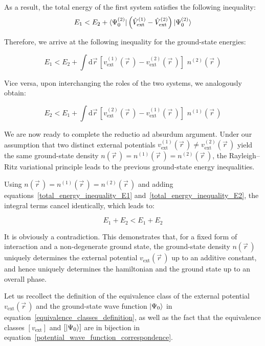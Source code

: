 As a result, the total energy of the first system satisfies the following inequality:
\begin{equation}
    E_1<E_2+\bra{\Psi_0^{(2)}}\left(\hat{V}_\mathrm{ext}^{(1)}-\hat{V}_\mathrm{ext}^{(2)}\right)\ket{\Psi_0^{(2)}}
\end{equation}

Therefore, we arrive at the following inequality for the ground-state energies:

\begin{equation}
    E_1<E_2+\int \mathrm{d}\vec{r}\,\left[v_\mathrm{ext}^{(1)}(\vec{r}\,)-v_\mathrm{ext}^{(2)}(\vec{r}\,)\right]\,\,n^{(2)}(\vec{r}\,)
\label{total_energy_inequality_E1}
\end{equation}

Vice versa, upon interchanging the roles of the two systems, we analogously obtain:

\begin{equation}
    E_2<E_1+\int \mathrm{d}\vec{r}\,\left[v_\mathrm{ext}^{(2)}(\vec{r}\,)-v_\mathrm{ext}^{(1)}(\vec{r}\,)\right]\,\,n^{(1)}(\vec{r}\,)
\label{total_energy_inequality_E2}
\end{equation}

We are now ready to complete the reductio ad absurdum argument.
Under our assumption that two distinct external potentials $v_\mathrm{ext}^{(1)}(\vec{r}\,)\neq v_\mathrm{ext}^{(2)}(\vec{r}\,)$ yield the same ground-state density $n(\vec{r}\,)=n^{(1)}(\vec{r}\,)=n^{(2)}(\vec{r}\,)$, the Rayleigh--Ritz variational principle leads to the previous ground-state energy inequalities.

Using $n(\vec{r}\,)=n^{(1)}(\vec{r}\,) = n^{(2)}(\vec{r}\,)$ and adding equations~\eqref{total_energy_inequality_E1}
and~\eqref{total_energy_inequality_E2}, the integral terms cancel identically, which leads to:

\begin{equation}
    E_1 + E_2 < E_1 + E_2
\label{total_energy_inequality_contradiction}
\end{equation}

It is obviously a contradiction.
This demonstrates that, for a fixed form of interaction and a non-degenerate ground state,
the ground-state density $n(\vec{r}\,)$ uniquely determines the external potential $v_\mathrm{ext}(\vec{r}\,)$ up to an additive constant,
and hence uniquely determines the hamiltonian and the ground state up to an overall phase.

Let us recollect the definition of the equivalence class of the external potential $v_\mathrm{ext}(\vec{r}\,)$ and the ground-state wave function $\ket{\Psi_0}$ in equation~\eqref{equivalence_classes_definition},
as well as the fact that the equivalence classes $\left[v_\mathrm{ext}\right]$ and $\left[\ket{\Psi_0}\right]$ are in bijection in equation~\eqref{potential_wave_function_correspondence}.

